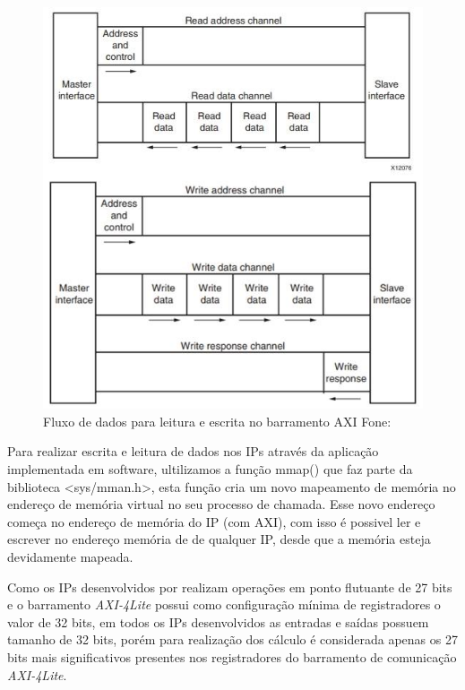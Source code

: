 \begin{figure}[h]
	\centering
	\includegraphics[keepaspectratio=true,scale=0.5]{figuras/axi_bus.png}
	\caption{Fluxo de dados para leitura e escrita no barramento AXI Fone: \cite{user-guide-axi}}
	\label{axi_bus}
\end{figure}

Para realizar escrita e leitura de dados nos IPs através da aplicação implementada em software, ultilizamos a função mmap() que faz parte da biblioteca <sys/mman.h>, esta função cria um novo mapeamento de memória no endereço de memória virtual no seu processo de chamada. Esse novo endereço começa no endereço de memória do IP (com AXI), com isso é possivel ler e escrever no endereço memória de de qualquer IP, desde que a memória esteja devidamente mapeada.

Como os IPs desenvolvidos por \cite{munoz2010tradeoff} realizam operações em ponto flutuante de 27 bits e o barramento \textit{AXI-4Lite} possui como configuração mínima de registradores o valor de 32 bits, em todos os IPs desenvolvidos as entradas e saídas possuem tamanho de 32 bits, porém para realização dos cálculo é considerada apenas os 27 bits mais significativos presentes nos registradores do barramento de comunicação \textit{AXI-4Lite}.
\vspace{\onelineskip}

